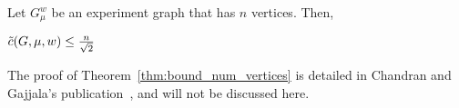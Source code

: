 \begin{theorem}
    \label{thm:bound_num_vertices}
    Let $G_\mu^w$ be an experiment graph that has $n$ vertices.
    Then,
    \begin{center}
        $\Tilde{c}(G, \mu, w) \leq \frac{n}{\sqrt{2}}$
    \end{center}
\end{theorem}

The proof of Theorem~\ref{thm:bound_num_vertices} is detailed in Chandran and Gajjala's publication~\cite{chandran2023graphtheoretic}, and will not be discussed here.
